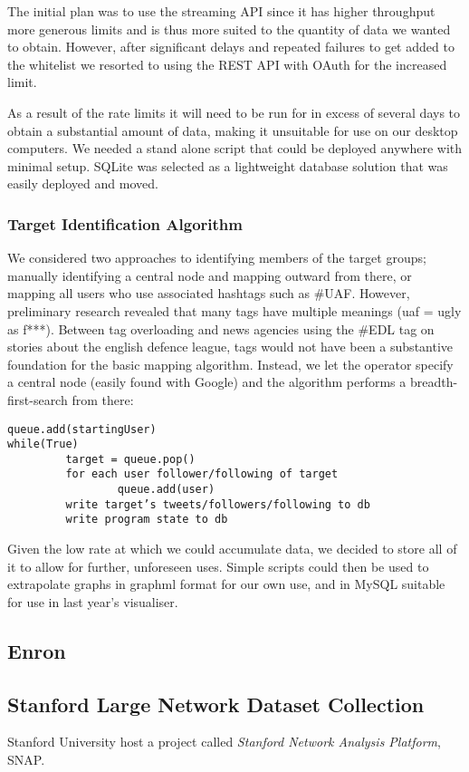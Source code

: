 The initial plan was to use the streaming API since it has higher throughput more generous limits and is thus more suited to the quantity of data we wanted to obtain. However, after significant delays and repeated failures to get added to the whitelist we resorted to using the REST API with OAuth for the increased limit.

As a result of the rate limits it will need to be run for in excess of several days to obtain a substantial amount of data, making it unsuitable for use on our desktop computers. We needed a stand alone script that could be deployed anywhere with minimal setup. SQLite was selected as a lightweight database solution that was easily deployed and moved.

\subsubsection{Target Identification Algorithm}
We considered two approaches to identifying members of the target groups; manually identifying a central node and mapping outward from there, or mapping all users who use associated hashtags such as \#UAF. However, preliminary research revealed that many tags have multiple meanings (uaf = ugly as f***). Between tag overloading and news agencies using the \#EDL tag on stories about the english defence league, tags would not have been a substantive foundation for the basic mapping algorithm. Instead, we let the operator specify a central node (easily found with Google) and the algorithm performs a breadth-first-search from there:

\begin{verbatim}
queue.add(startingUser)
while(True)
         target = queue.pop()
         for each user follower/following of target
                 queue.add(user)
         write target’s tweets/followers/following to db
         write program state to db
\end{verbatim}

Given the low rate at which we could accumulate data, we decided to store all of it to allow for further, unforeseen uses. Simple scripts could then be used to extrapolate graphs in graphml format for our own use, and in MySQL suitable for use in last year’s visualiser.
\subsection{Enron}

\subsection{Stanford Large Network Dataset Collection}
Stanford University host a project called \emph{Stanford Network Analysis Platform}, SNAP.

